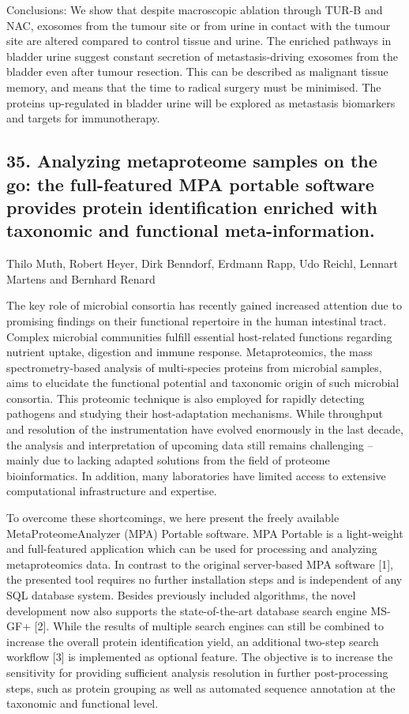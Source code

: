 Conclusions: We show that despite macroscopic ablation through TUR-B and NAC, exosomes from the tumour site or from urine in contact with the tumour site are altered compared to control tissue and urine. The enriched pathways in bladder urine suggest constant secretion of metastasis-driving exosomes from the bladder even after tumour resection. This can be described as malignant tissue memory, and means that the time to radical surgery must be minimised. The proteins up-regulated in bladder urine will be explored as metastasis biomarkers and targets for immunotherapy.

\subsection*{\color{eubicRed} 35. Analyzing metaproteome samples on the go: the full-featured MPA portable software provides protein identification enriched with taxonomic and functional meta-information.}
{\color{eubicGray}Thilo Muth, Robert Heyer, Dirk Benndorf, Erdmann Rapp, Udo Reichl, Lennart Martens and Bernhard Renard}

The key role of microbial consortia has recently gained increased attention due to promising findings on their functional repertoire in the human intestinal tract. Complex microbial communities fulfill essential host-related functions regarding nutrient uptake, digestion and immune response. Metaproteomics, the mass spectrometry-based analysis of multi-species proteins from microbial samples, aims to elucidate the functional potential and taxonomic origin of such microbial consortia. This proteomic technique is also employed for rapidly detecting pathogens and studying their host-adaptation mechanisms. While throughput and resolution of the instrumentation have evolved enormously in the last decade, the analysis and interpretation of upcoming data still remains challenging – mainly due to lacking adapted solutions from the field of proteome bioinformatics. In addition, many laboratories have limited access to extensive computational infrastructure and expertise.

To overcome these shortcomings, we here present the freely available MetaProteomeAnalyzer (MPA) Portable software. MPA Portable is a light-weight and full-featured application which can be used for processing and analyzing metaproteomics data. In contrast to the original server-based MPA software [1], the presented tool requires no further installation steps and is independent of any SQL database system. Besides previously included algorithms, the novel development now also supports the state-of-the-art database search engine MS-GF+ [2]. While the results of multiple search engines can still be combined to increase the overall protein identification yield, an additional two-step search workflow [3] is implemented as optional feature. The objective is to increase the sensitivity for providing sufficient analysis resolution in further post-processing steps, such as protein grouping as well as automated sequence annotation at the taxonomic and functional level.

